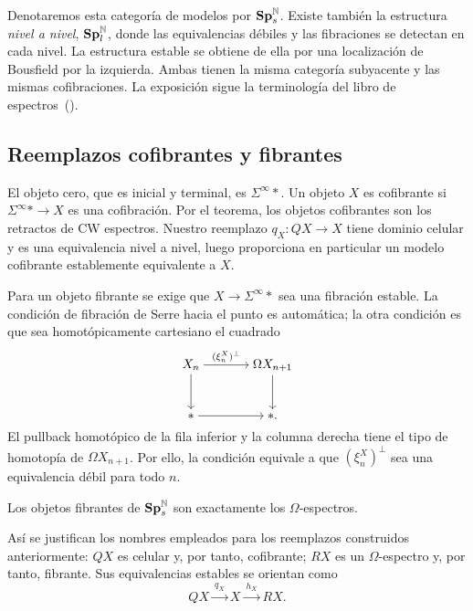 Denotaremos esta categoría de modelos por $\mathbf{Sp}^{\mathbb N}_s$. Existe también la estructura \emph{nivel a nivel}, $\mathbf{Sp}^{\mathbb N}_l$, donde las equivalencias débiles y las fibraciones se detectan en cada nivel. La estructura estable se obtiene de ella por una localización de Bousfield por la izquierda. Ambas tienen la misma categoría subyacente y las mismas cofibraciones. La exposición sigue la terminología del libro de espectros~(\cite{malkiewich}).

\subsection{Reemplazos cofibrantes y fibrantes}

El objeto cero, que es inicial y terminal, es $\Sigma^\infty *$. Un objeto $X$ es cofibrante si $\Sigma^\infty *\to X$ es una cofibración. Por el teorema, los objetos cofibrantes son los retractos de CW espectros. Nuestro reemplazo $q_X\colon QX\to X$ tiene dominio celular y es una equivalencia nivel a nivel, luego proporciona en particular un modelo cofibrante establemente equivalente a $X$.

Para un objeto fibrante se exige que $X\to\Sigma^\infty *$ sea una fibración estable. La condición de fibración de Serre hacia el punto es automática; la otra condición es que sea homotópicamente cartesiano el cuadrado
\[
\begin{tikzcd}[cramped,column sep=large,row sep=large]
X_n \arrow[r,"(\xi^X_n)^\perp"] \arrow[d]
& \Omega X_{n+1} \arrow[d]\\
* \arrow[r] & *.
\end{tikzcd}
\]
El pullback homotópico de la fila inferior y la columna derecha tiene el tipo de homotopía de $\Omega X_{n+1}$. Por ello, la condición equivale a que $(\xi^X_n)^\perp$ sea una equivalencia débil para todo $n$.

\begin{prop}
Los objetos fibrantes de $\mathbf{Sp}^{\mathbb N}_s$ son exactamente los $\Omega$-espectros.
\end{prop}
Así se justifican los nombres empleados para los reemplazos construidos anteriormente: $QX$ es celular y, por tanto, cofibrante; $RX$ es un $\Omega$-espectro y, por tanto, fibrante. Sus equivalencias estables se orientan como
\[
QX\xrightarrow{\ q_X\ }X\xrightarrow{\ h_X\ }RX.
\]


